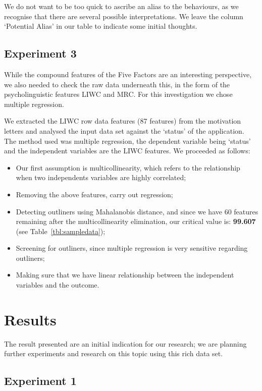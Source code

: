 \documentclass[letterpaper]{article}
\begin{document}
We do not want to be too quick to ascribe an alias to the behaviours,
as we recognise that there are several possible interpretations. We
leave the column `Potential Alias' in our table to indicate some
initial thoughts. 


\subsection{Experiment 3}

While the compound features of the Five Factors are an interesting
perspective, we also needed to check the raw data underneath this, in
the form of the psycholinguistic features LIWC and MRC. For this
investigation we chose multiple regression.

We extracted the LIWC row data features (87 features) from the
motivation letters and analysed the input data set against the
`status' of the application. The method used was multiple regression,
the dependent variable being `status' and the independent variables
are the LIWC features. We proceeded as follows:

\begin{itemize}
\item Our first assumption is multicollinearity, which refers to the
  relationship when two independents variables are highly correlated;
\item Removing the above features, carry out regression;
\item Detecting outliners using Mahalanobis distance, and since we
  have 60 features remaining after the multicollinearity elimination,
  our critical value is: {\textbf{99.607}} (see Table~\ref{tbl:sampledata});
\item Screening for outliners, since multiple regression is very
  sensitive regarding outliners;
\item Making sure that we have linear relationship between the
  independent variables and the outcome.
\end{itemize}


\section{Results}

The result presented are an initial indication for our research; we
are planning further experiments and research on this topic using this
rich data set.

\subsection{Experiment 1}
\end{document}
